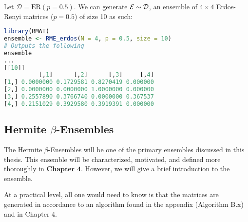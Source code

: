 \begin{code}[Erdos-Renyi p = 0.5 Ensemble]
Let $\mathcal{D} = \text{ER}(p = 0.5)$. We can generate $\mathcal{E} \sim \mathcal{D}$, an ensemble of $4 \times 4$ Erdos-Renyi matrices ($p = 0.5$) of size 10 as such:
\end{code}

\begin{lstlisting}[language=R]
library(RMAT)
ensemble <- RME_erdos(N = 4, p = 0.5, size = 10)
# Outputs the following
ensemble
...
[[10]]
          [,1]      [,2]      [,3]     [,4]
[1,] 0.0000000 0.1729581 0.8270419 0.000000
[2,] 0.0000000 0.0000000 1.0000000 0.000000
[3,] 0.2557890 0.3766740 0.0000000 0.367537
[4,] 0.2151029 0.3929580 0.3919391 0.000000
\end{lstlisting}


\subsection{Hermite $\beta$-Ensembles}

The Hermite $\beta$-Ensembles will be one of the primary ensembles discussed in this thesis. This ensemble will be characterized, motivated, and defined more thoroughly in $\textbf{Chapter 4}$. However, we will give a brief introduction to the ensemble.

At a practical level, all one would need to know is that the matrices are generated in accordance to an algorithm found in the appendix (Algorithm B.x) and in Chapter 4.



\begin{center}
  \Ddisttable
\end{center}
